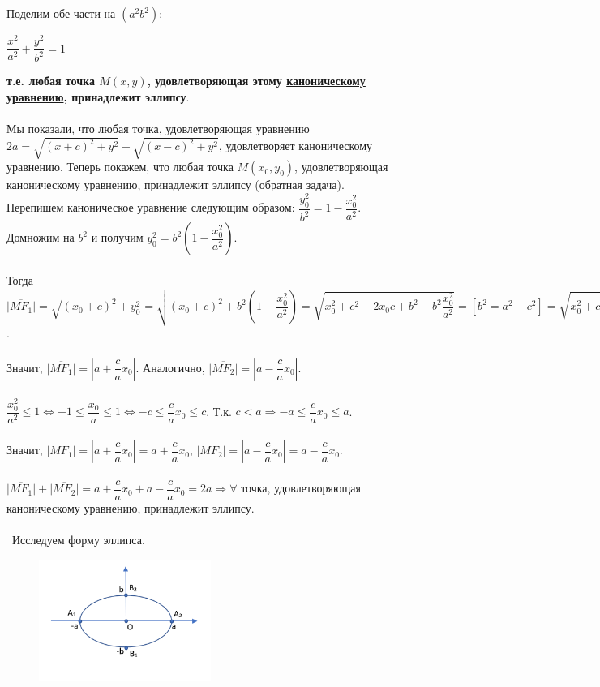 \documentclass[a4paper, 12pt]{report}
\begin{document}
Поделим обе части на $(a^2b^2)$: \begin{center}$\dfrac{x^2}{a^2} + \dfrac{y^2}{b^2} = 1$ \end{center}\textbf{т.е. любая точка $M(x, y)$, удовлетворяющая этому \underline{каноническому уравнению}, принадлежит эллипсу}.\\\\
Мы показали, что любая точка, удовлетворяющая уравнению $2a = \sqrt{(x + c)^2 + y^2} + \sqrt{(x - c)^2 + y^2}$, удовлетворяет каноническому уравнению. Теперь покажем, что любая точка $M(x_0, y_0)$, удовлетворяющая каноническому уравнению, принадлежит эллипсу (обратная задача).\\
Перепишем каноническое уравнение следующим образом: $\dfrac{y_0^2}{b^2} = 1 - \dfrac{x_0^2}{a^2}$. Домножим на $b^2$ и получим $y_0^2 = b^2(1 - \dfrac{x_0^2}{a^2})$.\\\\
Тогда $\overline{|MF_1|} = \sqrt{(x_0 + c)^2 + y_0^2} = \sqrt{(x_0 + c)^2 + b^2(1 - \dfrac{x_0^2}{a^2})} = \sqrt{x_0^2 + c^2 + 2x_0c + b^2 - b^2\dfrac{x_0^2}{a^2}} = [b^2 = a^2 - c^2] = \sqrt{x_0^2 + c^2 + 2x_0c + a^2 - c^2 - (a^2 - c^2)\dfrac{x_0^2}{a^2}} = \sqrt{2x_0c + a^2 + c^2\dfrac{x_0^2}{a^2}} = \sqrt{(a + \dfrac{cx_0}{a})^2} = |a + \dfrac{cx_0}{a}|$.\\\\
Значит, $\overline{|MF_1|} = |a + \dfrac{c}{a}x_0|$. Аналогично,  $\overline{|MF_2|} = |a - \dfrac{c}{a}x_0|$.\\\\
$\dfrac{x_0^2}{a^2} \leqslant 1 \Leftrightarrow -1 \leqslant \dfrac{x_0}{a} \leqslant 1 \Leftrightarrow -c \leqslant \dfrac{c}{a}x_0 \leqslant c$. Т.к. $c < a \Rightarrow -a \leqslant \dfrac{c}{a}x_0 \leqslant a$.\\\\
Значит, $\overline{|MF_1|} = |a + \dfrac{c}{a}x_0| = a + \dfrac{c}{a}x_0$, $\overline{|MF_2|} = |a - \dfrac{c}{a}x_0| = a - \dfrac{c}{a}x_0$.\\\\
$\overline{|MF_1|} + \overline{|MF_2|} = a + \dfrac{c}{a}x_0 + a - \dfrac{c}{a}x_0 = 2a \Rightarrow \forall$ точка, удовлетворяющая каноническому уравнению, принадлежит эллипсу.
\\\\\
Исследуем форму эллипса.\\
\begin{figure}
	\includegraphics[width=0.5\textwidth]{Эллипс_2.PNG}
	\label{ris:image}
\end{figure}
\end{document}
